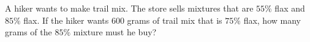 A hiker wants to make trail mix. The store sells mixtures that are $55\%$ flax and $85\%$ flax. If the hiker wants $600$ grams of trail mix that is $75\%$ flax, how many grams of the $85\%$ mixture must he buy?
